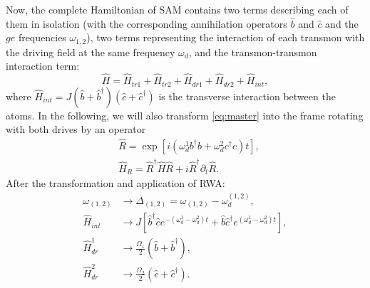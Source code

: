 \documentclass[%
 aip,
 amsmath,amssymb,
 reprint,%
]{revtex4-1}
\begin{document}
Now, the complete Hamiltonian of SAM contains two terms describing each of them in isolation (with the corresponding annihilation operators $\hat b$ and $\hat c$ and the $ge$ frequencies $\omega_{1,2}$), two terms representing the interaction of each transmon with the driving field at the same frequency $\omega_d$, and the transmon-transmon interaction term:
\begin{equation}\label{Hsystem}
\hat H = \hat H_{tr1}+\hat H_{tr2}+\hat H_{dr1}+\hat H_{dr2}+\hat H_{int},
\end{equation}
where $\hat H_{int} = J (\hat b +\hat b^\dag)(\hat c+\hat c^{\dagger})$ is the transverse interaction between the atoms. In the following, we will also transform \eqref{eq:master} into the frame rotating with both drives by an operator
\begin{align}
&\hat R = \exp[i (\omega_d^1 b^{\dagger}b+\omega_d^2 c^{\dagger}c)t],\\
&\hat H_R = \hat R^{\dagger}\hat H \hat R + i\hat R^{\dagger}\partial_t \hat R.
\end{align}
After the transformation and application of RWA:
\begin{equation}
\begin{aligned}
	\omega_{(1,2)} &\rightarrow \Delta_{(1,2)} = \omega_{(1,2)} - \omega_d^{(1,2)},\\
	\hat H_{int} &\rightarrow J \left[\hat b^\dag \hat c e^{-(\omega_d^1 - \omega_d^2)t} + \hat b \hat c^\dag e^{(\omega_d^1 - \omega_d^2)t}\right],\\
	\hat H_{dr}^1 &\rightarrow \frac{\Omega_1}{2}(\hat b  + \hat b^\dag),\\ 
	\hat H_{dr}^2 &\rightarrow \frac{\Omega_2}{2}(\hat c  + \hat c^\dag).
\end{aligned}
\label{eq:RWA}
\end{equation}
\end{document}

